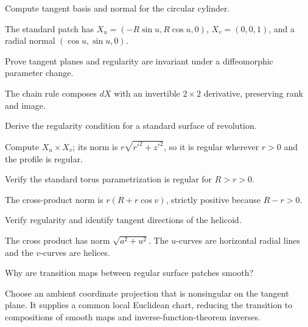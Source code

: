 \begin{problem}[Cylinder]\label{prob:vii14-06}
Compute tangent basis and normal for the circular cylinder.
\end{problem}
\begin{solution}
The standard patch has \(X_u=(-R\sin u,R\cos u,0)\), \(X_v=(0,0,1)\), and a radial normal \((\cos u,\sin u,0)\).
\end{solution}

\begin{problem}\label{prob:vii14-07}
Prove tangent planes and regularity are invariant under a diffeomorphic parameter change.
\end{problem}
\begin{solution}
The chain rule composes \(dX\) with an invertible \(2\times2\) derivative, preserving rank and image.
\end{solution}

\begin{problem}\label{prob:vii14-08}
Derive the regularity condition for a standard surface of revolution.
\end{problem}
\begin{solution}
Compute \(X_u\times X_v\); its norm is \(r\sqrt{r'^2+z'^2}\), so it is regular wherever \(r>0\) and the profile is regular.
\end{solution}

\begin{problem}[Torus]\label{prob:vii14-09}
Verify the standard torus parametrization is regular for \(R>r>0\).
\end{problem}
\begin{solution}
The cross-product norm is \(r(R+r\cos v)\), strictly positive because \(R-r>0\).
\end{solution}

\begin{problem}[Helicoid]\label{prob:vii14-10}
Verify regularity and identify tangent directions of the helicoid.
\end{problem}
\begin{solution}
The cross product has norm \(\sqrt{a^2+u^2}\). The \(u\)-curves are horizontal radial lines and the \(v\)-curves are helices.
\end{solution}

\begin{problem}\label{prob:vii14-11}
Why are transition maps between regular surface patches smooth?
\end{problem}
\begin{solution}
Choose an ambient coordinate projection that is nonsingular on the tangent plane. It supplies a common local Euclidean chart, reducing the transition to compositions of smooth maps and inverse-function-theorem inverses.
\end{solution}

